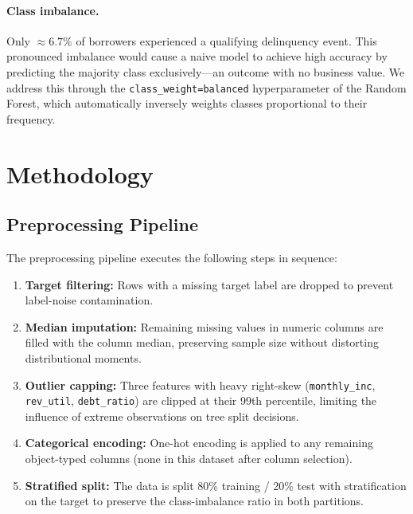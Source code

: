 \documentclass[11pt,a4paper]{article}
\begin{document}
\paragraph{Class imbalance.}
Only $\approx 6.7\%$ of borrowers experienced a qualifying delinquency event. This
pronounced imbalance would cause a naive model to achieve high accuracy by predicting the
majority class exclusively---an outcome with no business value. We address this through
the \texttt{class\_weight=\textquotesingle balanced\textquotesingle} hyperparameter of the
Random Forest, which automatically inversely weights classes proportional to their
frequency.

\section{Methodology}
\label{sec:methodology}

\subsection{Preprocessing Pipeline}

The preprocessing pipeline executes the following steps in sequence:

\begin{enumerate}
    \item \textbf{Target filtering:} Rows with a missing target label are dropped to
          prevent label-noise contamination.
    \item \textbf{Median imputation:} Remaining missing values in numeric columns are
          filled with the column median, preserving sample size without distorting
          distributional moments.
    \item \textbf{Outlier capping:} Three features with heavy right-skew
          (\texttt{monthly\_inc}, \texttt{rev\_util}, \texttt{debt\_ratio}) are clipped at
          their 99th percentile, limiting the influence of extreme observations on
          tree split decisions.
    \item \textbf{Categorical encoding:} One-hot encoding is applied to any remaining
          object-typed columns (none in this dataset after column selection).
    \item \textbf{Stratified split:} The data is split 80\% training / 20\% test with
          stratification on the target to preserve the class-imbalance ratio in both
          partitions.
\end{enumerate}
\end{document}
